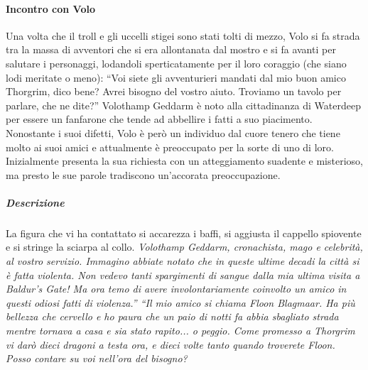 \documentclass{article}
\begin{document}
\paragraph{Incontro con Volo} 
Una volta che il troll e gli uccelli stigei sono stati tolti di
mezzo, Volo si fa strada tra la massa di avventori che si
era allontanata dal mostro e si fa avanti per salutare i
personaggi, lodandoli sperticatamente per il loro coraggio
(che siano lodi meritate o meno): “Voi siete gli avventurieri mandati dal mio buon amico Thorgrim,
dico bene? Avrei bisogno del vostro aiuto. Troviamo un
tavolo per parlare, che ne dite?”
Volothamp Geddarm è noto alla cittadinanza di
Waterdeep per essere un fanfarone che tende ad abbellire
i fatti a suo piacimento. Nonostante i suoi difetti, Volo
è però un individuo dal cuore tenero che tiene molto ai
suoi amici e attualmente è preoccupato per la sorte di
uno di loro. Inizialmente presenta la sua richiesta con un
atteggiamento suadente e misterioso, ma presto le sue
parole tradiscono un’accorata preoccupazione.

\subparagraph{Descrizione} La figura che vi ha contattato si accarezza i baffi, si
aggiusta il cappello spiovente e si stringe la sciarpa
al collo. \textit{Volothamp Geddarm, cronachista, mago e
celebrità, al vostro servizio. Immagino abbiate notato che
in queste ultime decadi la città si è fatta violenta. Non
vedevo tanti spargimenti di sangue dalla mia ultima visita
a Baldur's Gate! Ma ora temo di avere involontariamente
coinvolto un amico in questi odiosi fatti di violenza.”
“Il mio amico si chiama Floon Blagmaar. Ha più
bellezza che cervello e ho paura che un paio di notti fa
abbia sbagliato strada mentre tornava a casa e sia stato
rapito... o peggio. Come promesso a Thorgrim vi darò dieci dragoni a testa ora, e
dieci volte tanto quando troverete Floon. Posso contare
su voi nell'ora del bisogno?}
\end{document}

